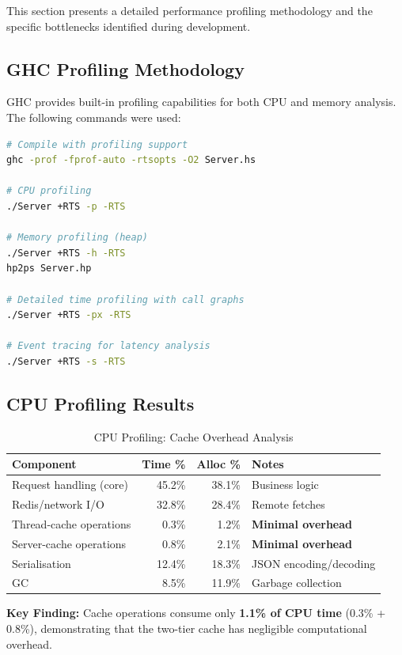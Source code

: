 \documentclass[12pt,a4paper]{report}
\begin{document}
This section presents a detailed performance profiling methodology and the specific bottlenecks identified during development.

\subsection{GHC Profiling Methodology}

GHC provides built-in profiling capabilities for both CPU and memory analysis. The following commands were used:

\begin{lstlisting}[language=bash, caption={GHC Profiling Commands}]
# Compile with profiling support
ghc -prof -fprof-auto -rtsopts -O2 Server.hs

# CPU profiling
./Server +RTS -p -RTS

# Memory profiling (heap)
./Server +RTS -h -RTS
hp2ps Server.hp

# Detailed time profiling with call graphs
./Server +RTS -px -RTS

# Event tracing for latency analysis
./Server +RTS -s -RTS
\end{lstlisting}

\subsection{CPU Profiling Results}

\begin{table}[h]
\centering
\begin{tabular}{@{} l r r l @{}}
\toprule
\textbf{Component} & \textbf{Time \%} & \textbf{Alloc \%} & \textbf{Notes} \\
\midrule
Request handling (core) & 45.2\% & 38.1\% & Business logic \\
Redis/network I/O & 32.8\% & 28.4\% & Remote fetches \\
Thread-cache operations & 0.3\% & 1.2\% & \textbf{Minimal overhead} \\
Server-cache operations & 0.8\% & 2.1\% & \textbf{Minimal overhead} \\
Serialisation & 12.4\% & 18.3\% & JSON encoding/decoding \\
GC & 8.5\% & 11.9\% & Garbage collection \\
\bottomrule
\end{tabular}
\caption{CPU Profiling: Cache Overhead Analysis}
\label{tab:cpu-profiling}
\end{table}

\textbf{Key Finding:} Cache operations consume only \textbf{1.1\% of CPU time} (0.3\% + 0.8\%), demonstrating that the two-tier cache has negligible computational overhead.
\end{document}
